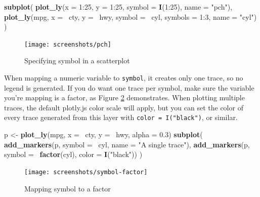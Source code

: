 \documentclass[12pt,]{isuthesis}
\newenvironment{Shaded}{\begin{snugshade}}{\end{snugshade}}
\newcommand{\KeywordTok}[1]{\textcolor[rgb]{0.13,0.29,0.53}{\textbf{{#1}}}}
\newcommand{\DataTypeTok}[1]{\textcolor[rgb]{0.13,0.29,0.53}{{#1}}}
\newcommand{\DecValTok}[1]{\textcolor[rgb]{0.00,0.00,0.81}{{#1}}}
\newcommand{\FloatTok}[1]{\textcolor[rgb]{0.00,0.00,0.81}{{#1}}}
\newcommand{\StringTok}[1]{\textcolor[rgb]{0.31,0.60,0.02}{{#1}}}
\newcommand{\NormalTok}[1]{{#1}}
\begin{document}
\begin{Shaded}
\begin{Highlighting}[]
\KeywordTok{subplot}\NormalTok{(}
  \KeywordTok{plot_ly}\NormalTok{(}\DataTypeTok{x =} \DecValTok{1}\NormalTok{:}\DecValTok{25}\NormalTok{, }\DataTypeTok{y =} \DecValTok{1}\NormalTok{:}\DecValTok{25}\NormalTok{, }\DataTypeTok{symbol =} \KeywordTok{I}\NormalTok{(}\DecValTok{1}\NormalTok{:}\DecValTok{25}\NormalTok{), }\DataTypeTok{name =} \StringTok{"pch"}\NormalTok{),}
  \KeywordTok{plot_ly}\NormalTok{(mpg, }\DataTypeTok{x =} \NormalTok{~cty, }\DataTypeTok{y =} \NormalTok{~hwy, }\DataTypeTok{symbol =} \NormalTok{~cyl, }\DataTypeTok{symbols =} \DecValTok{1}\NormalTok{:}\DecValTok{3}\NormalTok{, }\DataTypeTok{name =} \StringTok{"cyl"}\NormalTok{)}
\NormalTok{)}
\end{Highlighting}
\end{Shaded}

\begin{figure}
\centering
\texttt{[image: screenshots/pch]}
\caption{\label{fig:pch}Specifying symbol in a scatterplot}
\end{figure}

When mapping a numeric variable to \texttt{symbol}, it creates only one
trace, so no legend is generated. If you do want one trace per symbol,
make sure the variable you're mapping is a factor, as Figure
\ref{fig:symbol-factor} demonstrates. When plotting multiple traces, the
default plotly.js color scale will apply, but you can set the color of
every trace generated from this layer with
\texttt{color\ =\ I("black")}, or similar.

\begin{Shaded}
\begin{Highlighting}[]
\NormalTok{p <-}\StringTok{ }\KeywordTok{plot_ly}\NormalTok{(mpg, }\DataTypeTok{x =} \NormalTok{~cty, }\DataTypeTok{y =} \NormalTok{~hwy, }\DataTypeTok{alpha =} \FloatTok{0.3}\NormalTok{) }
\KeywordTok{subplot}\NormalTok{(}
  \KeywordTok{add_markers}\NormalTok{(p, }\DataTypeTok{symbol =} \NormalTok{~cyl, }\DataTypeTok{name =} \StringTok{"A single trace"}\NormalTok{),}
  \KeywordTok{add_markers}\NormalTok{(p, }\DataTypeTok{symbol =} \NormalTok{~}\KeywordTok{factor}\NormalTok{(cyl), }\DataTypeTok{color =} \KeywordTok{I}\NormalTok{(}\StringTok{"black"}\NormalTok{))}
\NormalTok{)}
\end{Highlighting}
\end{Shaded}

\begin{figure}
\centering
\texttt{[image: screenshots/symbol-factor]}
\caption{\label{fig:symbol-factor}Mapping symbol to a factor}
\end{figure}
\end{document}
